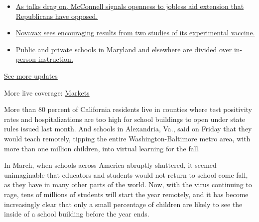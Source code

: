 \begin{itemize}
\tightlist
\item
  \href{https://www.nytimes3xbfgragh.onion/2020/08/04/world/coronavirus-cases.html?action=click\&pgtype=Article\&state=default\&region=MAIN_CONTENT_1\&context=storylines_live_updates\#link-2daa96b5}{As
  talks drag on, McConnell signals openness to jobless aid extension
  that Republicans have opposed.}
\item
  \href{https://www.nytimes3xbfgragh.onion/2020/08/04/world/coronavirus-cases.html?action=click\&pgtype=Article\&state=default\&region=MAIN_CONTENT_1\&context=storylines_live_updates\#link-1228a480}{Novavax
  sees encouraging results from two studies of its experimental
  vaccine.}
\item
  \href{https://www.nytimes3xbfgragh.onion/2020/08/04/world/coronavirus-cases.html?action=click\&pgtype=Article\&state=default\&region=MAIN_CONTENT_1\&context=storylines_live_updates\#link-4825b93}{Public
  and private schools in Maryland and elsewhere are divided over
  in-person instruction.}
\end{itemize}

\href{https://www.nytimes3xbfgragh.onion/2020/08/04/world/coronavirus-cases.html?action=click\&pgtype=Article\&state=default\&region=MAIN_CONTENT_1\&context=storylines_live_updates}{See
more updates}

More live coverage:
\href{https://www.nytimes3xbfgragh.onion/live/2020/08/04/business/stock-market-today-coronavirus?action=click\&pgtype=Article\&state=default\&region=MAIN_CONTENT_1\&context=storylines_live_updates}{Markets}

More than 80 percent of California residents live in counties where test
positivity rates and hospitalizations are too high for school buildings
to open under state rules issued last month. And schools in Alexandria,
Va., said on Friday that they would teach remotely, tipping the entire
Washington-Baltimore metro area, with more than one million children,
into virtual learning for the fall.

In March, when schools across America abruptly shuttered, it seemed
unimaginable that educators and students would not return to school come
fall, as they have in many other parts of the world. Now, with the virus
continuing to rage, tens of millions of students will start the year
remotely, and it has become increasingly clear that only a small
percentage of children are likely to see the inside of a school building
before the year ends.

